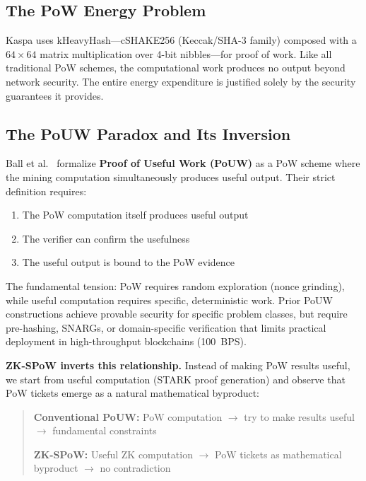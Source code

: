 \documentclass[11pt,a4paper]{article}
\begin{document}
\subsection{The PoW Energy Problem}

Kaspa uses kHeavyHash---cSHAKE256 (Keccak/SHA-3 family) composed with a $64\times64$ matrix multiplication over 4-bit nibbles---for proof of work. Like all traditional PoW schemes, the computational work produces no output beyond network security. The entire energy expenditure is justified solely by the security guarantees it provides.

\subsection{The PoUW Paradox and Its Inversion}
\label{sec:pouw-paradox}

Ball et al.~\cite{ball2017} formalize \textbf{Proof of Useful Work (PoUW)} as a PoW scheme where the mining computation simultaneously produces useful output. Their strict definition requires:
\begin{enumerate}
\item The PoW computation itself produces useful output
\item The verifier can confirm the usefulness
\item The useful output is bound to the PoW evidence
\end{enumerate}

The fundamental tension: PoW requires random exploration (nonce grinding), while useful computation requires specific, deterministic work. Prior PoUW constructions \cite{ball2017,ofelimos,komargodski2025,baron2025} achieve provable security for specific problem classes, but require pre-hashing, SNARGs, or domain-specific verification that limits practical deployment in high-throughput blockchains (100~BPS).

\textbf{ZK-SPoW inverts this relationship.} Instead of making PoW results useful, we start from useful computation (STARK proof generation) and observe that PoW tickets emerge as a natural mathematical byproduct:

\begin{quote}
\textbf{Conventional PoUW:} PoW computation $\to$ try to make results useful $\to$ fundamental constraints~\cite{ball2017}

\textbf{ZK-SPoW:} Useful ZK computation $\to$ PoW tickets as mathematical byproduct $\to$ no contradiction
\end{quote}
\end{document}
